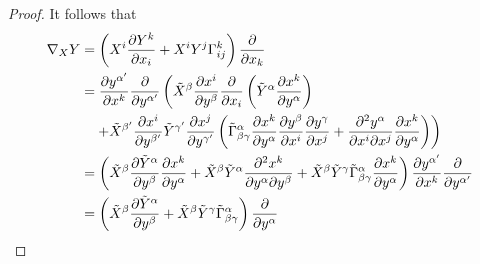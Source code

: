 \begin{enumerate}[label=\arabic{*}.]
\begin{proof}
		\noindent It follows that
		\begin{equation*}
			\begin{aligned}
				\nabla_XY &= \left(X^i\frac{\partial Y^k}{\partial x_i}+X^iY^j\Gamma^k_{ij}\right)\frac{\partial}{\partial x_k} \\
				&= \frac{\partial y^{\alpha^\prime}}{\partial x^k} \frac{\partial}{\partial y^{\alpha^\prime}} \left(\tilde{X}^\beta\frac{\partial x^i}{\partial y^\beta}\frac{\partial}{\partial x_i}\left(\tilde{Y}^\alpha\frac{\partial x^k}{\partial y^\alpha}\right) \right.\\ 
				&\quad \left.+ \tilde{X}^{\beta^\prime}\frac{\partial x^i}{\partial y^{\beta^\prime}}\tilde{Y}^{\gamma^\prime}\frac{\partial x^j}{\partial y^{\gamma^\prime}}\left(\tilde{\Gamma}^\alpha_{\beta\gamma}\frac{\partial x^k}{\partial y^\alpha}\frac{\partial y^\beta}{\partial x^i}\frac{\partial y^\gamma}{\partial x^j} + \frac{\partial^2 y^\alpha}{\partial x^i\partial x^j}\frac{\partial x^k}{\partial y^\alpha}\right)\right)\\
				&= \left(\tilde{X}^\beta\frac{\partial \tilde{Y}^\alpha}{\partial y^\beta} \frac{\partial x^k}{\partial y^\alpha} + \tilde{X}^\beta\tilde{Y}^\alpha \frac{\partial^2 x^k}{\partial y^\alpha\partial y^\beta} + \tilde{X}^{\beta}\tilde{Y}^{\gamma}\tilde{\Gamma}^\alpha_{\beta\gamma}\frac{\partial x^k}{\partial y^\alpha}\right)\frac{\partial y^{\alpha^\prime}}{\partial x^k} \frac{\partial}{\partial y^{\alpha^\prime}} \\
				&= \left(\tilde{X}^\beta\frac{\partial \tilde{Y}^\alpha}{\partial y^\beta} + \tilde{X}^{\beta}\tilde{Y}^{\gamma}\tilde{\Gamma}^\alpha_{\beta\gamma}\right) \frac{\partial}{\partial y^{\alpha}}
			\end{aligned}
		\end{equation*}
	\end{proof}


\end{enumerate}
